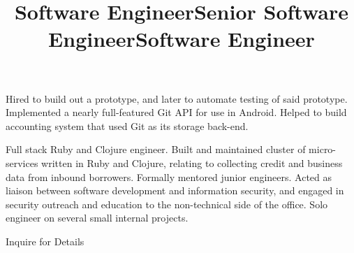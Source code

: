 \documentclass[margin,line,letterpaper]{resume}
\begin{document}
\begin{resume}
  \title{\bf Software Engineer}
  \location{}
  \begin{position}
    Hired to build out a prototype, and later to automate testing of
    said prototype. Implemented a nearly full-featured Git API for use
    in Android. Helped to build accounting system that used Git as
    its storage back-end.
  \end{position}

  \title{\bf Senior Software Engineer}
  \location{}
  \begin{position}
    Full stack Ruby and Clojure engineer. Built and maintained
    cluster of micro-services written in Ruby and Clojure, relating
    to collecting credit and business data from inbound borrowers.
    Formally mentored junior engineers. Acted as liaison between
    software development and information security, and engaged in
    security outreach and education to the non-technical side of
    the office. Solo engineer on several small internal projects.
  \end{position}

  \title{\bf Software Engineer}
  \location{}
  \begin{position}
    Inquire for Details
  \end{position}


\end{resume}
\end{document}
